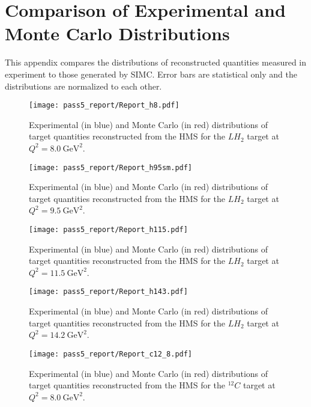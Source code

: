 \chapter{Comparison of Experimental and Monte Carlo Distributions} \label{app:distributions}
This appendix compares the distributions of reconstructed quantities measured in experiment
to those generated by SIMC.
Error bars are statistical only and the distributions are normalized to each other.
\begin{figure}[!h]
    \centering
    \texttt{[image: pass5\_report/Report\_h8.pdf]}
    \caption{
            Experimental (in blue) and Monte Carlo (in red) distributions of
            target quantities reconstructed from the HMS for
            the $LH_2$ target at $Q^2=\SI{8.0}{\giga\electronvolt\squared}$.
            }
    \label{fig:Report_h8.pdf}
\end{figure}


\begin{figure}[!h]
    \centering
    \texttt{[image: pass5\_report/Report\_h95sm.pdf]}
    \caption{
            Experimental (in blue) and Monte Carlo (in red) distributions of
            target quantities reconstructed from the HMS for
            the $LH_2$ target at $Q^2=\SI{9.5}{\giga\electronvolt\squared}$.
            }
    \label{fig:Report_h95sm.pdf}
\end{figure}


\begin{figure}[!h]
    \centering
    \texttt{[image: pass5\_report/Report\_h115.pdf]}
    \caption{
            Experimental (in blue) and Monte Carlo (in red) distributions of
            target quantities reconstructed from the HMS for
            the $LH_2$ target at $Q^2=\SI{11.5}{\giga\electronvolt\squared}$.
            }
    \label{fig:Report_h115.pdf}
\end{figure}


\begin{figure}[!h]
    \centering
    \texttt{[image: pass5\_report/Report\_h143.pdf]}
    \caption{
            Experimental (in blue) and Monte Carlo (in red) distributions of
            target quantities reconstructed from the HMS for
            the $LH_2$ target at $Q^2=\SI{14.2}{\giga\electronvolt\squared}$.
            }
    \label{fig:Report_h143.pdf}
\end{figure}


\begin{figure}[!h]
    \centering
    \texttt{[image: pass5\_report/Report\_c12\_8.pdf]}
    \caption{
            Experimental (in blue) and Monte Carlo (in red) distributions of
            target quantities reconstructed from the HMS for
            the ${}^{12}C$ target at $Q^2=\SI{8.0}{\giga\electronvolt\squared}$.
            }
    \label{fig:Report_c12_8.pdf}
\end{figure}


